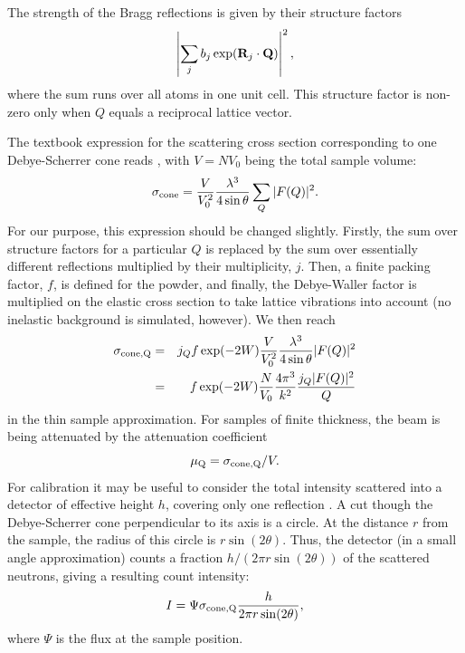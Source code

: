 The strength of the Bragg reflections is given by their structure factors
\begin{equation}
 \left| \sum_j b_j \exp({\bf R}_j \cdot {\bf Q}) \right|^2 ,
\end{equation}
where the sum runs over all atoms in one unit cell. This structure factor is
non-zero only when $Q$ equals a reciprocal lattice vector.

The textbook expression for the scattering cross section
corresponding to one Debye-Scherrer cone reads \cite[ch.3.6]{squires}, with $V=N V_0$ being the total sample volume:
\begin{equation}
\sigma_{\rm cone}
  = \frac{V}{V_0^2} \frac{\lambda^3}{4 \sin \theta} \sum_Q |F(Q)|^2 .
\end{equation}
For our purpose, this expression should be changed slightly.
Firstly, the sum over structure factors for a particular $Q$ is replaced
by the sum over essentially different reflections multiplied by their
multiplicity, $j$. Then, a finite packing factor, $f$, is defined for the powder,
and finally, the Debye-Waller factor is multiplied on the elastic cross section
to take lattice vibrations into account (no inelastic background is simulated,
however). We then reach
\begin{eqnarray}
\sigma_{\rm cone, Q}
 & = & j_Q f \exp(-2W) \frac{V}{V_0^2} \frac{\lambda^3}{4 \sin \theta} |F(Q)|^2 \\
 & = & f \exp(-2W) \frac{N}{V_0} \frac{4\pi^3}{k^2} \frac{j_Q |F(Q)|^2}{Q}
\end{eqnarray}
in the thin sample approximation. For samples of finite thickness, the
beam is being attenuated by the attenuation coefficient
\begin{equation}
\label{e:attenu}
\mu_{\rm Q} = \sigma_{\rm cone,Q} / V .
\end{equation}
For calibration it may be useful to consider the total intensity
scattered into a detector of effective height $h$, covering only
one reflection \cite[ch.3.6]{squires}.
A cut though the Debye-Scherrer cone perpendicular to its axis
is a circle. At the distance $r$ from the sample, the radius of this
circle is $r \sin(2\theta)$. Thus, the detector (in a small angle
approximation) counts a fraction $h / (2 \pi r \sin(2 \theta))$
of the scattered neutrons, giving a resulting count intensity:
\begin{equation}
I = \Psi \sigma_{\rm cone,Q} \frac{h}{2 \pi r \sin(2\theta)} ,
\end{equation}
where $\Psi$ is the flux at the sample position.

